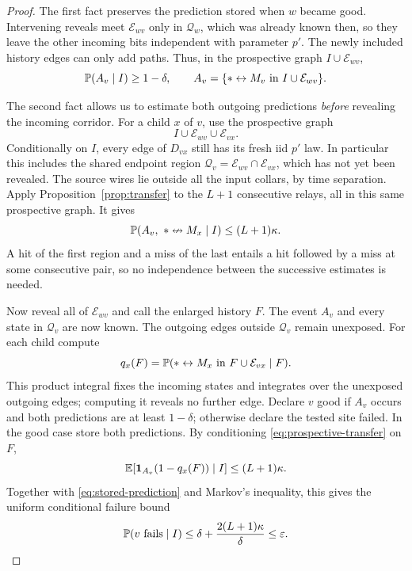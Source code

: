 \begin{proof}
The first fact preserves the prediction stored when $w$ became good.
Intervening reveals meet $\mathcal E_{wv}$ only in $\mathcal Q_w$,
which was already known then, so they leave the other incoming bits
independent with parameter $p'$. The newly included history edges can
only add paths. Thus, in the prospective graph $I\cup\mathcal E_{wv}$,
\begin{equation}\label{eq:stored-prediction}
 \mathbb P(A_v\mid I)\ge1-\delta,
 \qquad A_v=\{*\leftrightarrow M_v\text{ in }I\cup\mathcal E_{wv}\}.
\end{equation}

The second fact allows us to estimate both outgoing predictions
\emph{before} revealing the incoming corridor. For a child $x$ of $v$,
use the prospective graph
\[
 I\cup\mathcal E_{wv}\cup\mathcal E_{vx}.
\]
Conditionally on $I$, every edge of $D_{vx}$ still has its fresh iid
$p'$ law. In particular this includes the shared endpoint region
$\mathcal Q_v=\mathcal E_{wv}\cap\mathcal E_{vx}$, which has not yet
been revealed. The source wires lie outside all the input collars,
by time separation. Apply Proposition~\ref{prop:transfer} to the
$L+1$ consecutive relays, all in this same prospective graph. It gives
\begin{equation}\label{eq:prospective-transfer}
 \mathbb P(A_v,\ *\nleftrightarrow M_x\mid I)\le(L+1)\kappa.
\end{equation}
A hit of the first region and a miss of the last entails a hit
followed by a miss at some consecutive pair, so no independence
between the successive estimates is needed.

Now reveal all of $\mathcal E_{wv}$ and call the enlarged history
$F$. The event $A_v$ and every state in $\mathcal Q_v$ are now known.
The outgoing edges outside $\mathcal Q_v$ remain unexposed. For each
child compute
\[
 q_x(F)=\mathbb P(*\leftrightarrow M_x\text{ in }F\cup\mathcal E_{vx}\mid F).
\]
This product integral fixes the incoming states and integrates over
the unexposed outgoing edges; computing it reveals no further edge.
Declare $v$ good if $A_v$ occurs and both predictions are at least
$1-\delta$; otherwise declare the tested site failed. In the good
case store both predictions. By conditioning
\eqref{eq:prospective-transfer} on $F$,
\[
 \mathbb E[\mathbf1_{A_v}(1-q_x(F))\mid I]\le(L+1)\kappa.
\]
Together with \eqref{eq:stored-prediction} and Markov's inequality,
this gives the uniform conditional failure bound
\begin{equation}\label{eq:conditional-test-failure}
 \mathbb P(v\text{ fails}\mid I)
 \le\delta+\frac{2(L+1)\kappa}{\delta}
 \le\varepsilon.
\end{equation}


\end{proof}
